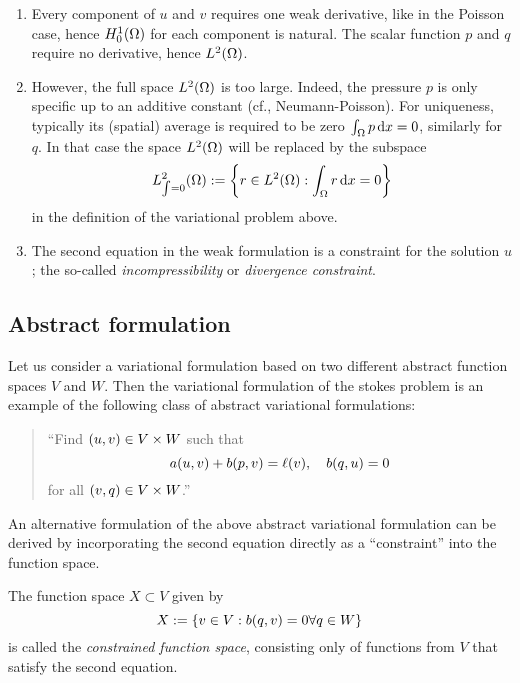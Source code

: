 \begin{remark}
	\begin{enumerate}
		\item Every component of \(u\) and \(v\) requires one weak derivative, like in the Poisson case, hence \(H_0^1\parentheses*{\Omega}\) for each component is natural.
		The scalar function \(p\) and \(q\) require no derivative, hence \(L^2\parentheses*{\Omega}\).
		\item However, the full space \(L^2\parentheses*{\Omega}\) is too large.
		Indeed, the pressure \(p\) is only specific up to an additive constant (cf., Neumann-Poisson).
		For uniqueness, typically its (spatial) average is required to be zero \(\int_\Omega p\d x = 0\), similarly for \(q\).
		In that case the space \(L^2\parentheses*{\Omega}\) will be replaced by the subspace
		\[
			L_{\int = 0}^2\parentheses*{\Omega} := \braces*{r \in L^2\parentheses*{\Omega} : \int_\Omega r\d x = 0}
		\]
		in the definition of the variational problem above.
		\item The second equation in the weak formulation is a constraint for the solution \(u\); the so-called \emph{incompressibility} or \emph{divergence constraint}.
	\end{enumerate}
\end{remark}


\subsection{Abstract formulation}

Let us consider a variational formulation based on two different abstract function spaces \(V\) and \(W\).
Then the variational formulation of the stokes problem is an example of the following class of abstract variational formulations:
\begin{quote}
	``Find \(\parentheses*{u, v} \in V \times W\) such that
	\[
		a\parentheses*{u, v} + b\parentheses*{p, v} = \ell\parentheses*{v}, \quad b\parentheses*{q, u} = 0
	\]
	for all \(\parentheses*{v, q} \in V \times W\).''
\end{quote}
An alternative formulation of the above abstract variational formulation can be derived by incorporating the second equation directly as a ``constraint'' into the function space.

\begin{definition}
	The function space \(X \subset V\) given by
	\[
		X := \braces*{v \in V : b\parentheses*{q, v} = 0 \forall q \in W}
	\]
	is called the \emph{constrained function space}, consisting only of functions from \(V\) that satisfy the second equation.
\end{definition}

